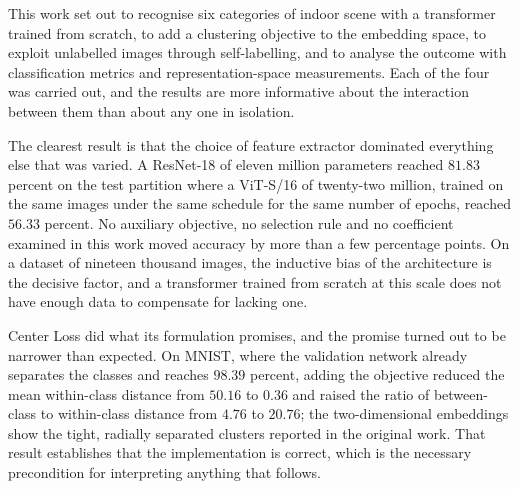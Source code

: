 %
%
%
%

\label{chap:conclusions}

This work set out to recognise six categories of indoor scene with a
transformer trained from scratch, to add a clustering objective to the
embedding space, to exploit unlabelled images through self-labelling, and to
analyse the outcome with classification metrics and representation-space
measurements. Each of the four was carried out, and the results are more
informative about the interaction between them than about any one in isolation.

The clearest result is that the choice of feature extractor dominated
everything else that was varied. A ResNet-18 of eleven million parameters
reached \(81.83\) percent on the test partition where a ViT-S/16 of
twenty-two million, trained on the same images under the same schedule for the
same number of epochs, reached \(56.33\) percent. No auxiliary objective, no
selection rule and no coefficient examined in this work moved accuracy by more
than a few percentage points. On a dataset of nineteen thousand images, the
inductive bias of the architecture is the decisive factor, and a transformer
trained from scratch at this scale does not have enough data to compensate for
lacking one.

Center Loss did what its formulation promises, and the promise turned out to be
narrower than expected. On MNIST, where the validation network already
separates the classes and reaches \(98.39\) percent, adding the objective
reduced the mean within-class distance from \(50.16\) to \(0.36\) and raised the
ratio of between-class to within-class distance from \(4.76\) to \(20.76\); the
two-dimensional embeddings show the tight, radially separated clusters reported
in the original work. That result establishes that the implementation is
correct, which is the necessary precondition for interpreting anything that
follows.

